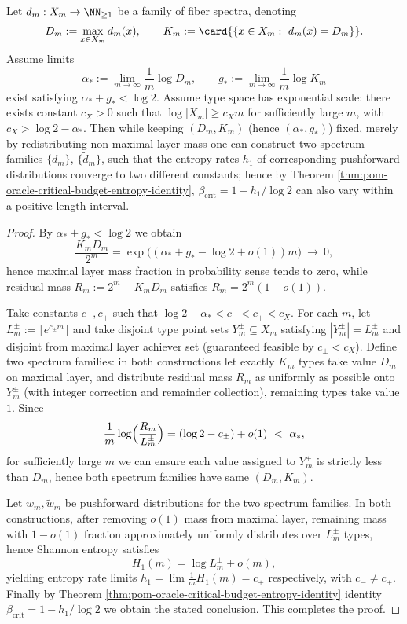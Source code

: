 \begin{corollary}\label{cor:pom-extremes-do-not-determine-beta-crit}
Let \(d_m:X_m\to\NN_{\ge 1}\) be a family of fiber spectra, denoting
\[
D_m:=\max_{x\in X_m}d_m(x),\qquad
K_m:=\card{\{x\in X_m:\ d_m(x)=D_m\}}.
\]
Assume limits
\[
\alpha_*:=\lim_{m\to\infty}\frac{1}{m}\log D_m,\qquad
g_*:=\lim_{m\to\infty}\frac{1}{m}\log K_m
\]
exist satisfying \(\alpha_*+g_*<\log2\).
Assume type space has exponential scale: there exists constant \(c_X>0\) such that \(\log|X_m|\ge c_X m\) for sufficiently large \(m\), with \(c_X>\log2-\alpha_*\).
Then while keeping \((D_m,K_m)\) (hence \((\alpha_*,g_*)\)) fixed, merely by redistributing non-maximal layer mass one can construct two spectrum families \(\{d_m\}\), \(\{\tilde d_m\}\), such that the entropy rates \(h_1\) of corresponding pushforward distributions converge to two different constants; hence by Theorem \ref{thm:pom-oracle-critical-budget-entropy-identity}, \(\beta_{\mathrm{crit}}=1-h_1/\log2\) can also vary within a positive-length interval.
\end{corollary}
\begin{proof}
By \(\alpha_*+g_*<\log2\) we obtain
\[
\frac{K_mD_m}{2^m}=\exp\!\bigl((\alpha_*+g_*-\log2+o(1))m\bigr)\ \longrightarrow\ 0,
\]
hence maximal layer mass fraction in probability sense tends to zero, while residual mass
\(
R_m:=2^m-K_mD_m
\)
satisfies \(R_m=2^m(1-o(1))\).
\par
Take constants \(c_-,c_+\) such that \(\log2-\alpha_*<c_-<c_+<c_X\).
For each \(m\), let \(L_m^\pm:=\lfloor e^{c_\pm m}\rfloor\) and take disjoint type point sets \(Y_m^\pm\subseteq X_m\) satisfying \(|Y_m^\pm|=L_m^\pm\) and disjoint from maximal layer achiever set (guaranteed feasible by \(c_\pm<c_X\)).
Define two spectrum families: in both constructions let exactly \(K_m\) types take value \(D_m\) on maximal layer, and distribute residual mass \(R_m\) as uniformly as possible onto \(Y_m^\pm\) (with integer correction and remainder collection), remaining types take value \(1\).
Since
\[
\frac{1}{m}\log\Bigl(\frac{R_m}{L_m^\pm}\Bigr)
=(\log2-c_\pm)+o(1)\ <\ \alpha_*,
\]
for sufficiently large \(m\) we can ensure each value assigned to \(Y_m^\pm\) is strictly less than \(D_m\), hence both spectrum families have same \((D_m,K_m)\).
\par
Let \(w_m,\tilde w_m\) be pushforward distributions for the two spectrum families.
In both constructions, after removing \(o(1)\) mass from maximal layer, remaining mass with \(1-o(1)\) fraction approximately uniformly distributes over \(L_m^\pm\) types,
hence Shannon entropy satisfies
\[
H_1(m)=\log L_m^\pm+o(m),
\]
yielding entropy rate limits
\(
h_1=\lim\frac1m H_1(m)=c_\pm
\) respectively, with \(c_-\ne c_+\).
Finally by Theorem \ref{thm:pom-oracle-critical-budget-entropy-identity} identity \(\beta_{\mathrm{crit}}=1-h_1/\log2\) we obtain the stated conclusion. This completes the proof.
\end{proof}
